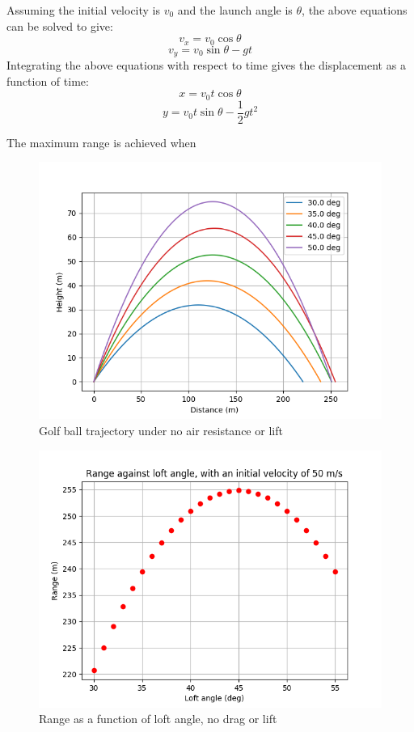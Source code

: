 \documentclass[12pt]{article}
\begin{document}
Assuming the initial velocity is $v_0$ and the launch angle is $\theta$, the above equations can be solved to give:
\begin{equation}
v_x=v_0 \cos{\theta}
\end{equation}
\begin{equation}
v_y=v_0 \sin{\theta}-gt
\end{equation}
Integrating the above equations with respect to time gives the displacement as a function of time:
\begin{equation}
x=v_0 t \cos{\theta}
\end{equation}
\begin{equation}
y=v_0 t \sin{\theta}-\frac{1}{2} g t^2
\end{equation}

The maximum range is achieved when

\begin{figure}[H]
\centering
\caption{Golf ball trajectory under no air resistance or lift}
\includegraphics[scale=0.7]{simple}
\end{figure}

\begin{figure}[H]
\centering
\caption{Range as a function of loft angle, no drag or lift}
\includegraphics[scale=0.8]{simplerange}
\end{figure}
\end{document}
